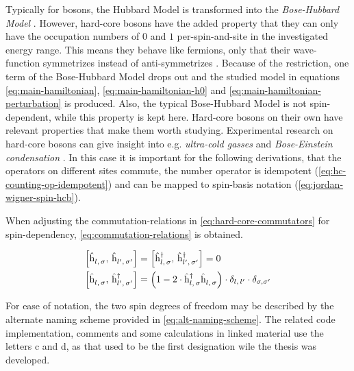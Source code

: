 Typically for bosons, the Hubbard Model is transformed into the \emph{Bose-Hubbard Model} \cite{boseHubbardModelOriginalDerivation}.
However, hard-core bosons have the added property that they can only have the occupation numbers of $0$ and $1$ per-spin-and-site in the investigated energy range.
This means they behave like fermions, only that their wave-function symmetrizes instead of anti-symmetrizes \cite{schwablBook}.
Because of the restriction, one term of the Bose-Hubbard Model drops out and the studied model in equations \ref{eq:main-hamiltonian}, \ref{eq:main-hamiltonian-h0} and \ref{eq:main-hamiltonian-perturbation} is produced.
Also, the typical Bose-Hubbard Model is not spin-dependent, while this property is kept here.
Hard-core bosons on their own have relevant properties that make them worth studying. 
Experimental research on hard-core bosons can give insight into e.g. \emph{ultra-cold gasses} and \emph{Bose-Einstein condensation} \cite{hardCoreBosonsBasics}. 
In this case it is important for the following derivations, that the operators on different sites commute, the number operator is idempotent (\ref{eq:hc-counting-op-idempotent}) and can be mapped to spin-basis notation (\ref{eq:jordan-wigner-spin-hcb}).

When adjusting the commutation-relations in \autoref{eq:hard-core-commutators} for spin-dependency, \autoref{eq:commutation-relations} is obtained.

\begin{equation}
    \label{eq:commutation-relations}
    \begin{split}
        \left[\withspinhcop[]{l}{\sigma}{},\,\withspinhcop[]{l'}{\sigma'}{}\right] &= 
        \left[\withspinhcop[]{l}{\sigma}{\dagger},\,\withspinhcop[]{l'}{\sigma'}{\dagger}\right] = 0\\
        \left[\withspinhcop[]{l}{\sigma}{},\,\withspinhcop[]{l'}{\sigma'}{\dagger}\right] &= 
        \left(1 - 2 \cdot \withspinhcop[]{l}{\sigma}{\dagger}\withspinhcop[]{l}{\sigma}{} \right) \cdot \delta_{l,\,l'}\cdot\delta_{\sigma,\sigma'}
    \end{split}
\end{equation}

For ease of notation, the two spin degrees of freedom may be described by the alternate naming scheme provided in \autoref{eq:alt-naming-scheme}.
The related code implementation, comments and some calculations in linked material \cite{selfCode} use the letters c and d, as that used to be the first designation wile the thesis was developed.

